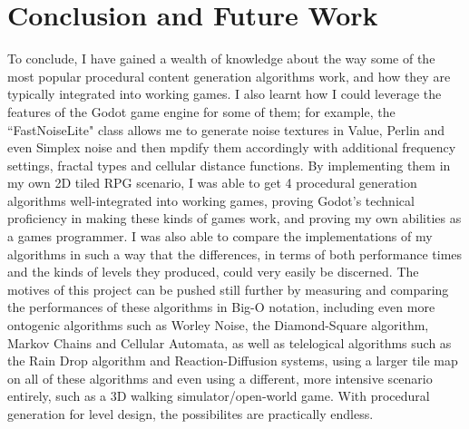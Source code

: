 \chapter{Conclusion and Future Work} \label{Conclusion}


To conclude, I have gained a wealth of knowledge about the way some of the most popular procedural content generation algorithms work, and how they are typically integrated into working games. I also learnt how I could leverage the features of the Godot game engine for some of them; for example, the ``FastNoiseLite" class allows me to generate noise textures in Value, Perlin and even Simplex noise and then mpdify them accordingly with additional frequency settings, fractal types and cellular distance functions. By implementing them in my own 2D tiled RPG scenario, I was able to get 4 procedural generation algorithms well-integrated into working games, proving Godot's technical proficiency in making these kinds of games work, and proving my own abilities as a games programmer. I was also able to compare the implementations of my algorithms in such a way that the differences, in terms of both performance times and the kinds of levels they produced, could very easily be discerned. The motives of this project can be pushed still further by measuring and comparing the performances of these algorithms in Big-O notation, including even more ontogenic algorithms such as Worley Noise, the Diamond-Square algorithm, Markov Chains and Cellular Automata, as well as telelogical algorithms such as the Rain Drop algorithm and Reaction-Diffusion systems, using a larger tile map on all of these algorithms and even using a different, more intensive scenario entirely, such as a 3D walking simulator/open-world game. With procedural generation for level design, the possibilites are practically endless.